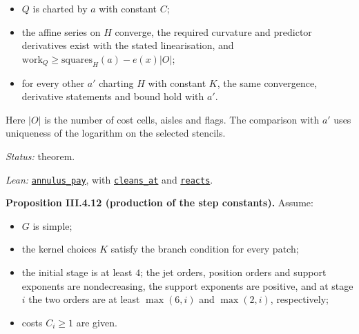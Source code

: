 \documentclass[
  letterpaper,
  11pt]{article}
\providecommand{\tightlist}{%
  \setlength{\itemsep}{0pt}\setlength{\parskip}{0pt}}
\begin{document}
\begin{itemize}
\tightlist
\item
  \(Q\) is charted by \(a\) with constant \(C\);
\item
  the affine series on \(H\) converge, the required curvature and
  predictor derivatives exist with the stated linearisation, and
  \(\mathrm{work}_Q\ge\mathrm{squares}_H(a)-e(x)\lvert O\rvert\);
\item
  for every other \(a'\) charting \(H\) with constant \(K\), the same
  convergence, derivative statements and bound hold with \(a'\).
\end{itemize}

Here \(|O|\) is the number of cost cells, aisles and flags. The
comparison with \(a'\) uses uniqueness of the logarithm on the selected
stencils.

\emph{Status:} theorem.

\emph{Lean:}
\href{https://github.com/yang-mills-group/OpenAI-YM-20261028/blob/3456e5e75cf8d4cd558955a5c7638fba2d68f464/YM/SectorNext/LARGE_FIELD_REMAINDERS/Annulus.lean\#L36-L127}{\texttt{annulus\_pay}},
with
\href{https://github.com/yang-mills-group/OpenAI-YM-20261028/blob/3456e5e75cf8d4cd558955a5c7638fba2d68f464/YM/SectorNext/LARGE_FIELD_REMAINDERS/Clean.lean\#L110-L208}{\texttt{cleans\_at}}
and
\href{https://github.com/yang-mills-group/OpenAI-YM-20261028/blob/3456e5e75cf8d4cd558955a5c7638fba2d68f464/YM/SectorNext/LARGE_FIELD_REMAINDERS/CollarData.lean\#L131-L189}{\texttt{reacts}}.

\textbf{Proposition III.4.12 (production of the step constants).}
Assume:

\begin{itemize}
\tightlist
\item
  \(G\) is simple;
\item
  the kernel choices \(K\) satisfy the branch condition for every patch;
\item
  the initial stage is at least \(4\); the jet orders, position orders
  and support exponents are nondecreasing, the support exponents are
  positive, and at stage \(i\) the two orders are at least \(\max(6,i)\)
  and \(\max(2,i)\), respectively;
\item
  costs \(C_i\ge1\) are given.
\end{itemize}
\end{document}

